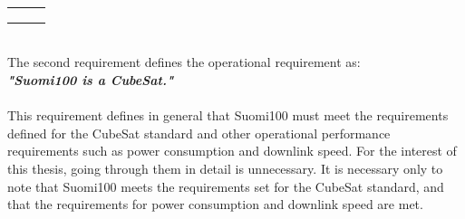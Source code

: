 \documentclass[english,12pt,a4paper,pdftex,elec,utf8]{aaltothesis}
\begin{document}
\begin{table}[!h]
\begin{tabular}{|l|l|l|}
                                                                                                                                                  \\ 
                                                                                                                                                 &
                                                                                                                                                 &
                                                                                                                                                  \\
                                                                                                                                                  &
                                                                                                                                                  &
                                                                                                                                                  \\ 
                                                                                                                                                  &
                                                                                                                                                  &
                                                                                                                                                   \\
                                                                                                                                                  
                                                                                                                                                   
                                                                                                                                                    \hline
\end{tabular}
\end{table}
\\
The second requirement defines the operational requirement as:\\
\textbf{\textit{"Suomi100 is a CubeSat."}}
\\
\\
This requirement defines in general that Suomi100 must meet the requirements defined for the CubeSat standard and other operational performance requirements such as power consumption and downlink speed. For the interest of this thesis, going through them in detail is unnecessary. It is necessary only to note that Suomi100 meets the requirements set for the CubeSat standard, and that the requirements for power consumption and downlink speed are met. \par
\end{document}
